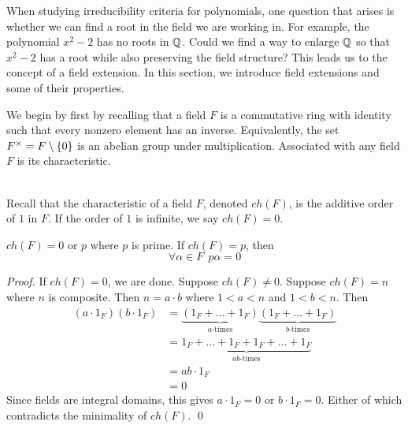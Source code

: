 When studying irreducibility criteria for polynomials, one question that arises is whether we can find a root in the field we are working in. For example, the polynomial $x^2-2$ has no roots in $\mathbb{Q}$. Could we find a way to enlarge $\mathbb{Q}$ so that $x^2-2$ has a root while also preserving the field structure? This leads us to the concept of a field extension. In this section, we introduce field extensions and some of their properties.

We begin by first by recalling that a field $F$ is a commutative ring with identity such that every nonzero element has an inverse. Equivalently, the set $F^\times = F \setminus \left\{0\right\}$ is an abelian group under multiplication. Associated with any field $F$ is its characteristic.
\begin{definition} \leavevmode \\
    Recall that the characteristic of a field $F$, denoted $ch(F)$, is the additive order of $1$ in $F$. If the order of $1$ is infinite, we say $ch(F) = 0$.
\end{definition}

\begin{proposition}
    $ch(F) = 0$ or $p$ where $p$ is prime. If $ch(F) = p$, then
    $$\forall \alpha \in F~~p\alpha = 0$$
\end{proposition}

\begin{proof}
    If $ch(F) = 0$, we are done. Suppose $ch(F) \neq 0$. Suppose $ch(F) = n$ where $n$ is composite. Then $n = a\cdot b$ where $ 1< a < n$ and $1 < b <n$. Then 
    \begin{align*}
        (a \cdot 1_F)(b\cdot 1_F) &= \underbrace{(1_F + ... + 1_F)}_{a \text{-times}}\underbrace{(1_F + ... + 1_F)}_{b \text{-times}} \\
        &= \underbrace{1_F+...+1_F+1_F+...+1_F}_{ab \text{-times}} \\ 
        &= ab \cdot 1_F \\
        &= 0
    \end{align*}
    Since fields are integral domains, this gives $a \cdot 1_F = 0$ or $b \cdot 1_F = 0$. Either of which contradicts the minimality of $ch(F)$.
    \qed
\end{proof}

